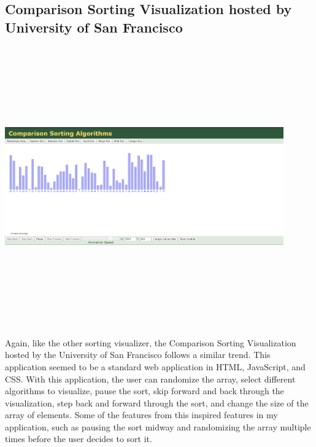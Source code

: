 \subsection{Comparison Sorting Visualization hosted by University of San Francisco}
\begin{center}
    \includegraphics[width=12cm,height=12cm,keepaspectratio]{images/compsort}
\end{center}
Again, like the other sorting visualizer, the Comparison Sorting Visualization hosted by the University of San Francisco follows a similar trend. This application seemed to be a standard web application in HTML, JavaScript, and CSS. With this application, the user can randomize the array, select different algorithms to visualize, pause the sort, skip forward and back through the visualization, step back and forward through the sort, and change the size of the array of elements. Some of the features from this inspired features in my application, such as pausing the sort midway and randomizing the array multiple times before the user decides to sort it.

\newpage
